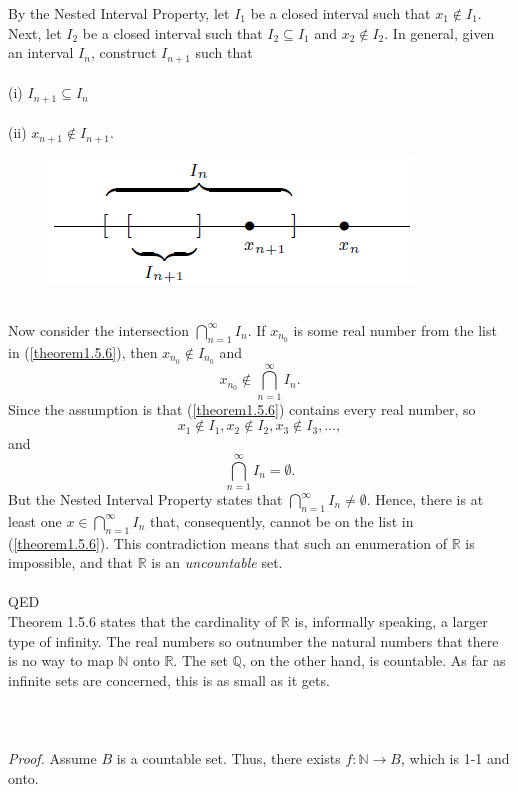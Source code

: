 \documentclass{article}
\begin{document}
            By the Nested Interval Property, let $I_1$ be a closed interval such that $x_1 \notin I_1$. Next, let $I_2$ be a closed interval such that $I_2 \subseteq I_1$ and $x_2 \notin I_2$. In general, given an interval $I_n$, construct $I_{n+1}$ such that\\ \\
            (i) $I_{n+1} \subseteq I_n$\\ \\
            (ii) $x_{n+1} \notin I_{n+1}.$
            \begin{figure}[ht!]
                \centering
                \includegraphics[width=0.5\linewidth]{figs/theorem1.5.6(2).png}
            \end{figure}\\
            Now consider the intersection $\bigcap_{n=1}^\infty I_n$. If $x_{n_0}$ is some real number from the list in (\ref{theorem1.5.6}), then $x_{n_0} \notin I_{n_0}$ and
            \begin{equation*}
                x_{n_0} \notin \bigcap_{n=1}^\infty I_n.
            \end{equation*}
            Since the assumption is that (\ref{theorem1.5.6}) contains every real number, so
            \begin{equation*}
                x_1 \notin I_1, x_2 \notin I_2, x_3 \notin I_3, \dots,
            \end{equation*}
            and
            \begin{equation*}
                \bigcap_{n=1}^\infty I_n = \emptyset.
            \end{equation*}
            But the Nested Interval Property states that $\bigcap_{n=1}^\infty I_n \neq \emptyset$. Hence, there is at least one $x \in \bigcap_{n=1}^\infty I_n$ that, consequently, cannot be on the list in (\ref{theorem1.5.6}). This contradiction means that such an enumeration of $\mathbb{R}$ is impossible, and that $\mathbb{R}$ is an \textit{uncountable} set.\\ \\
            QED \\
            
            Theorem 1.5.6 states that the cardinality of $\mathbb{R}$ is, informally speaking, a larger type of infinity. The real numbers so outnumber the natural numbers that there is no way to map $\mathbb{N}$ onto $\mathbb{R}$. The set $\mathbb{Q}$, on the other hand, is countable. As far as infinite sets are concerned, this is as small as it gets.
            \\ \\
            \\ \\
            \textit{Proof.} Assume $B$ is a countable set. Thus, there exists $f:\mathbb{N} \to B$, which is 1-1 and onto.
            
\end{document}
